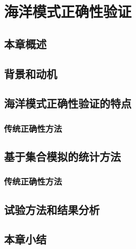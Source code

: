 \chapter{海洋模式正确性验证}
\label{cha:verify}

\section{本章概述}

\section{背景和动机}
\label{sec:verifyBackgroud}

\section{海洋模式正确性验证的特点}
\label{sec:verifyPart1}
\subsection{传统正确性方法}
\label{sec:verifyPart11}

\section{基于集合模拟的统计方法}
\label{sec:verifyEnsemble}
\subsection{传统正确性方法}
\label{sec:verifyPart21}

\section{试验方法和结果分析}
\label{sec:verifyExp}

\section{本章小结}
\label{sec:verifyConclusion}
